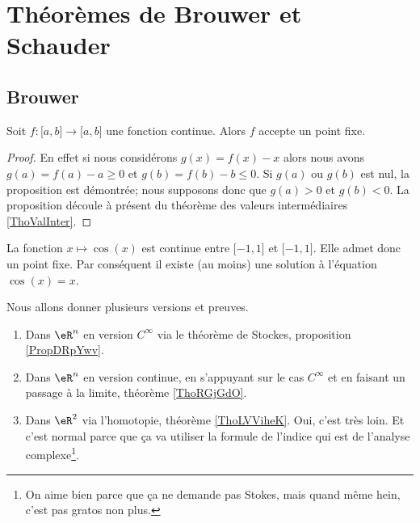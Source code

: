 
\section{Théorèmes de Brouwer et Schauder}

\subsection{Brouwer}
\label{SecZCCmMnQ}

\begin{proposition}
    Soit \( f\colon \mathopen[ a , b \mathclose]\to \mathopen[ a , b \mathclose]\) une fonction continue. Alors \( f\) accepte un point fixe.
\end{proposition}

\begin{proof}
    En effet si nous considérons \( g(x)=f(x)-x\) alors nous avons \( g(a)=f(a)-a\geq 0\) et \( g(b)=f(b)-b\leq 0\). Si \( g(a)\) ou \( g(b)\) est nul, la proposition est démontrée; nous supposons donc que \( g(a)>0\) et \( g(b)<0\). La proposition découle à présent du théorème des valeurs intermédiaires \ref{ThoValInter}.
\end{proof}

\begin{example}
    La fonction \( x\mapsto\cos(x)\) est continue entre \( \mathopen[ -1 , 1 \mathclose]\) et \( \mathopen[ -1 , 1 \mathclose]\). Elle admet donc un point fixe. Par conséquent il existe (au moins) une solution à l'équation \( \cos(x)=x\).
\end{example}

Nous allons donner plusieurs versions et preuves.
\begin{enumerate}
    \item
        Dans \( \eR^n\) en version \( C^{\infty}\) via le théorème de Stockes, proposition \ref{PropDRpYwv}.
    \item
        Dans \( \eR^n\) en version continue, en s'appuyant sur le cas \( C^{\infty}\) et en faisant un passage à la limite, théorème \ref{ThoRGjGdO}.
    \item
        Dans \( \eR^2\) via l'homotopie, théorème \ref{ThoLVViheK}. Oui, c'est très loin. Et c'est normal parce que ça va utiliser la formule de l'indice qui est de l'analyse complexe\footnote{On aime bien parce que ça ne demande pas Stokes, mais quand même hein, c'est pas gratos non plus.}.
\end{enumerate}

